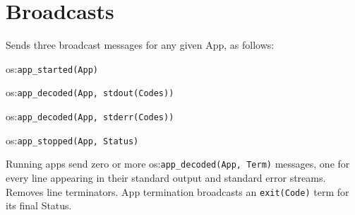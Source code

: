 \section{Broadcasts}

Sends three broadcast messages for any given App, as follows:

\begin{shortlist}
    \item os:\verb$app_started(App)$
    \item os:\verb$app_decoded(App, stdout(Codes))$
    \item os:\verb$app_decoded(App, stderr(Codes))$
    \item os:\verb$app_stopped(App, Status)$
\end{shortlist}

Running apps send zero or more os:\verb$app_decoded(App, Term)$ messages,
one for every line appearing in their standard output and standard
error streams. Removes line terminators. App termination broadcasts
an \verb$exit(Code)$ term for its final Status.\vspace{0.7cm}

